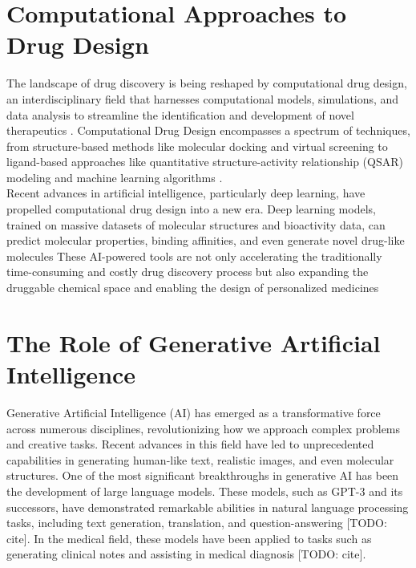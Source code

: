 \section{Computational Approaches to Drug Design} 
The landscape of drug discovery is being reshaped by computational drug design, an interdisciplinary
field that harnesses computational models, simulations, and data analysis to streamline the
identification and development of novel therapeutics \cite{schneider2020rethinking}. Computational
Drug Design encompasses a spectrum of techniques, from structure-based methods like molecular
docking \cite{kitchen2004docking} and virtual screening \cite{shoichet2004virtual} to ligand-based
approaches like quantitative structure-activity relationship (QSAR) modeling
\cite{cherkasov2014qsar} and machine learning algorithms \cite{gawehn2016dl}. \\

Recent advances in artificial intelligence, particularly deep learning, have propelled computational
drug design into a new era. Deep learning models, trained on massive datasets of molecular
structures and bioactivity data, can predict molecular properties, binding affinities, and even
generate novel drug-like molecules \cite{zeng2022deep} These AI-powered tools are not only
accelerating the traditionally time-consuming and costly drug discovery process but also expanding
the druggable chemical space and enabling the design of personalized medicines \cite{gawehn2016dl}


\section{The Role of Generative Artificial Intelligence} 
Generative Artificial Intelligence (AI) has emerged as a transformative force across numerous disciplines, revolutionizing how we approach complex problems and creative tasks. Recent advances in this field have led to unprecedented capabilities in generating human-like text, realistic images, and even molecular structures. One of the most significant breakthroughs in generative AI has been the development of large language models. These models, such as GPT-3 and its successors, have demonstrated remarkable abilities in natural language processing tasks, including text generation, translation, and question-answering [TODO: cite]. In the medical field, these models have been applied to tasks such as generating clinical notes and assisting in medical diagnosis [TODO: cite]. \\

